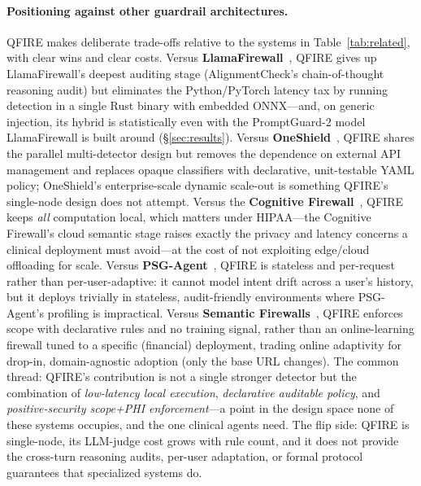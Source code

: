 \documentclass[11pt]{article}
\begin{document}
\paragraph{Positioning against other guardrail architectures.}
QFIRE makes deliberate trade-offs relative to the systems in
Table~\ref{tab:related}, with clear wins and clear costs. Versus
\textbf{LlamaFirewall}~\cite{llamafirewall2025}, QFIRE gives up LlamaFirewall's
deepest auditing stage (AlignmentCheck's chain-of-thought reasoning audit) but
eliminates the Python/PyTorch latency tax by running detection in a single Rust
binary with embedded ONNX---and, on generic injection, its hybrid is statistically
even with the PromptGuard-2 model LlamaFirewall is built around
(\S\ref{sec:results}). Versus \textbf{OneShield}~\cite{oneshield2025}, QFIRE shares
the parallel multi-detector design but removes the dependence on external API
management and replaces opaque classifiers with declarative, unit-testable YAML
policy; OneShield's enterprise-scale dynamic scale-out is something QFIRE's
single-node design does not attempt. Versus the \textbf{Cognitive
Firewall}~\cite{cognitivefirewall2026}, QFIRE keeps \emph{all} computation local,
which matters under HIPAA---the Cognitive Firewall's cloud semantic stage raises
exactly the privacy and latency concerns a clinical deployment must avoid---at the
cost of not exploiting edge/cloud offloading for scale. Versus
\textbf{PSG-Agent}~\cite{psgagent2025}, QFIRE is stateless and per-request rather
than per-user-adaptive: it cannot model intent drift across a user's history, but
it deploys trivially in stateless, audit-friendly environments where PSG-Agent's
profiling is impractical. Versus \textbf{Semantic
Firewalls}~\cite{semanticfirewall2026}, QFIRE enforces scope with declarative rules
and no training signal, rather than an online-learning firewall tuned to a specific
(financial) deployment, trading online adaptivity for drop-in, domain-agnostic
adoption (only the base URL changes). The common thread: QFIRE's contribution is not a single stronger
detector but the combination of \emph{low-latency local execution},
\emph{declarative auditable policy}, and \emph{positive-security scope+PHI
enforcement}---a point in the design space none of these systems occupies, and the
one clinical agents need. The flip side: QFIRE is single-node, its
LLM-judge cost grows with rule count, and it does not provide the cross-turn
reasoning audits, per-user adaptation, or formal protocol guarantees that
specialized systems do.
\end{document}
